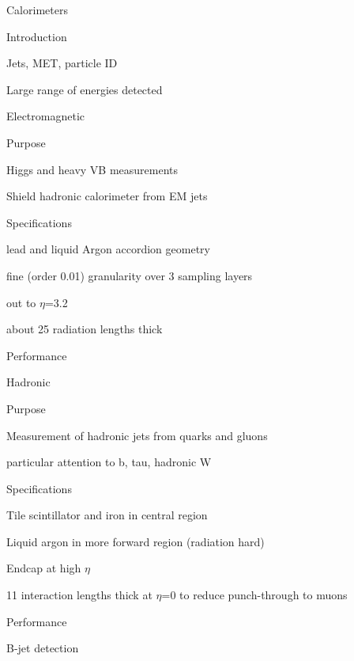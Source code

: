 \documentclass[11pt]{report}
\begin{document}
\begin{outline}
	\item Calorimeters  
	\begin{outline}
		\item Introduction
		\begin{outline}
			\item Jets, MET, particle ID
			\item Large range of energies detected
		\end{outline}
		\item Electromagnetic
		\begin{outline}
			\item Purpose
			\begin{outline}
				\item Higgs and heavy VB measurements
				\item Shield hadronic calorimeter from EM jets
			\end{outline}
			\item Specifications
			\begin{outline}
				\item lead and liquid Argon accordion geometry
				\item fine (order 0.01) granularity over 3 sampling layers
				\item out to $\eta$=3.2
				\item about 25 radiation lengths thick
			\end{outline}
			\item Performance
		\end{outline}
		\item Hadronic
		\begin{outline}
			\item Purpose
				\begin{outline}
					\item Measurement of hadronic jets from quarks and gluons
					\item particular attention to b, tau, hadronic W
				\end{outline}
			\item Specifications
				\begin{outline}
					\item Tile scintillator and iron in central region
					\item Liquid argon in more forward region (radiation hard)
					\item Endcap at high $\eta$
					\item 11 interaction lengths thick at $\eta$=0 to reduce punch-through to muons
				\end{outline}
			\item Performance
			\item B-jet detection
		\end{outline}
	\end{outline}
	

\end{outline}
\end{document}
